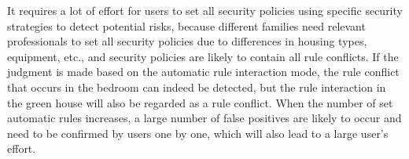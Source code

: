 It requires a lot of effort for users to set all security policies using specific security strategies to detect potential risks, because different families need relevant professionals to set all security policies due to differences in housing types, equipment, etc., and security policies are likely to contain all rule conflicts. If the judgment is made based on the automatic rule interaction mode, the rule conflict that occurs in the bedroom can indeed be detected, but the rule interaction in the green house will also be regarded as a rule conflict. When the number of set automatic rules increases, a large number of false positives are likely to occur and need to be confirmed by users one by one, which will also lead to a large user's effort.